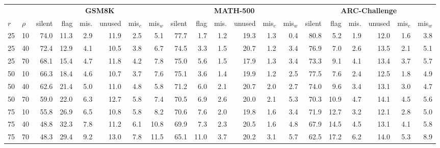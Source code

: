 \begin{tabular}{ll rrrrrr rrrrrr rrrrrr}
\toprule
& & \multicolumn{6}{c}{\textbf{GSM8K}} & \multicolumn{6}{c}{\textbf{MATH-500}} & \multicolumn{6}{c}{\textbf{ARC-Challenge}} \\
\cmidrule(lr){3-8}\cmidrule(lr){9-14}\cmidrule(lr){15-20}
\textbf{$r$} & \textbf{$\rho$} & silent & flag & mis. & unused & mis$_{c}$ & mis$_{w}$ & silent & flag & mis. & unused & mis$_{c}$ & mis$_{w}$ & silent & flag & mis. & unused & mis$_{c}$ & mis$_{w}$ \\
\midrule
25 & 10 & 74.0 & 11.3 & 2.9 & 11.9 & 2.5 & 5.1 & 77.7 & 1.7 & 1.2 & 19.3 & 1.3 & 0.4 & 80.8 & 5.2 & 1.9 & 12.0 & 1.6 & 3.8 \\
25 & 40 & 72.4 & 12.9 & 4.1 & 10.5 & 3.8 & 6.7 & 74.5 & 3.3 & 1.5 & 20.7 & 1.2 & 3.4 & 76.9 & 7.0 & 2.6 & 13.5 & 2.1 & 5.1 \\
25 & 70 & 68.1 & 15.4 & 4.7 & 11.8 & 4.2 & 7.8 & 75.0 & 5.6 & 1.5 & 17.9 & 1.3 & 3.4 & 73.3 & 9.1 & 4.1 & 13.4 & 3.7 & 5.7 \\
50 & 10 & 66.3 & 18.4 & 4.6 & 10.7 & 3.7 & 7.6 & 75.1 & 3.6 & 1.4 & 19.9 & 1.2 & 2.5 & 77.5 & 7.6 & 2.4 & 12.5 & 1.8 & 4.9 \\
50 & 40 & 62.6 & 21.4 & 5.0 & 11.0 & 4.8 & 5.8 & 71.2 & 6.0 & 2.1 & 20.7 & 2.0 & 2.7 & 74.0 & 9.6 & 3.4 & 13.1 & 3.0 & 4.7 \\
50 & 70 & 59.0 & 22.0 & 6.3 & 12.7 & 5.8 & 7.4 & 70.5 & 6.9 & 2.6 & 20.0 & 2.1 & 5.3 & 70.3 & 10.9 & 4.7 & 14.1 & 4.5 & 5.6 \\
75 & 10 & 55.8 & 26.9 & 6.5 & 10.8 & 5.8 & 8.2 & 70.6 & 7.6 & 2.0 & 19.8 & 1.6 & 3.4 & 71.9 & 12.7 & 3.2 & 12.1 & 2.8 & 5.0 \\
75 & 40 & 48.8 & 32.3 & 7.8 & 11.2 & 6.1 & 10.8 & 69.9 & 7.3 & 2.3 & 20.5 & 1.6 & 4.8 & 67.9 & 14.5 & 4.5 & 13.1 & 4.1 & 5.8 \\
75 & 70 & 48.3 & 29.4 & 9.2 & 13.0 & 7.8 & 11.5 & 65.1 & 11.0 & 3.7 & 20.2 & 3.1 & 5.7 & 62.5 & 17.2 & 6.2 & 14.0 & 5.3 & 8.9 \\
\bottomrule
\end{tabular}
